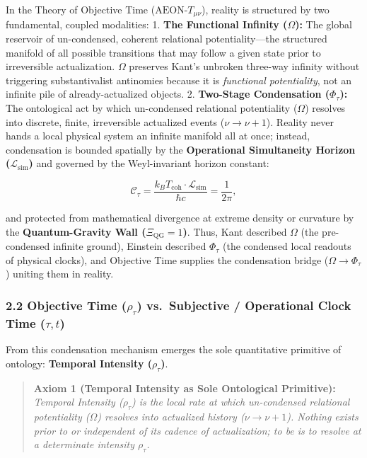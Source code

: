 \documentclass[
]{article}
\begin{document}
In the Theory of Objective Time (\(\text{AEON-}T_{\mu\nu}\)), reality is
structured by two fundamental, coupled modalities: 1. \textbf{The
Functional Infinity (\(\Omega\)):} The global reservoir of un-condensed,
coherent relational potentiality---the structured manifold of all
possible transitions that may follow a given state prior to irreversible
actualization. \(\Omega\) preserves Kant's unbroken three-way infinity
without triggering substantivalist antinomies because it is
\emph{functional potentiality}, not an infinite pile of
already-actualized objects. 2. \textbf{Two-Stage Condensation
(\(\Phi_\tau\)):} The ontological act by which un-condensed relational
potentiality (\(\Omega\)) resolves into discrete, finite, irreversible
actualized events (\(\nu \to \nu + 1\)). Reality never hands a local
physical system an infinite manifold all at once; instead, condensation
is bounded spatially by the \textbf{Operational Simultaneity Horizon
(\(\mathcal{L}_{\text{sim}}\))} and governed by the Weyl-invariant
horizon constant:

\[\mathcal{C}_\tau = \frac{k_B T_{\text{coh}} \cdot \mathcal{L}_{\text{sim}}}{\hbar c} = \frac{1}{2\pi},\]

and protected from mathematical divergence at extreme density or
curvature by the \textbf{Quantum-Gravity Wall
(\(\Xi_{\text{QG}} = 1\))}. Thus, Kant described \(\Omega\) (the
pre-condensed infinite ground), Einstein described \(\Phi_\tau\) (the
condensed local readouts of physical clocks), and Objective Time
supplies the condensation bridge (\(\Omega \to \Phi_\tau\)) uniting them
in reality.

\subsubsection{\texorpdfstring{2.2 Objective Time (\(\rho_\tau\))
vs.~Subjective / Operational Clock Time
(\(\tau, t\))}{2.2 Objective Time (\textbackslash rho\_\textbackslash tau) vs.~Subjective / Operational Clock Time (\textbackslash tau, t)}}\label{objective-time-rho_tau-vs.-subjective-operational-clock-time-tau-t}

From this condensation mechanism emerges the sole quantitative primitive
of ontology: \textbf{Temporal Intensity (\(\rho_\tau\))}.

\begin{quote}
\textbf{Axiom 1 (Temporal Intensity as Sole Ontological Primitive):}\\
\emph{Temporal Intensity (\(\rho_\tau\)) is the local rate at which
un-condensed relational potentiality (\(\Omega\)) resolves into
actualized history (\(\nu \to \nu + 1\)). Nothing exists prior to or
independent of its cadence of actualization; to be is to resolve at a
determinate intensity \(\rho_\tau\).}
\end{quote}
\end{document}
